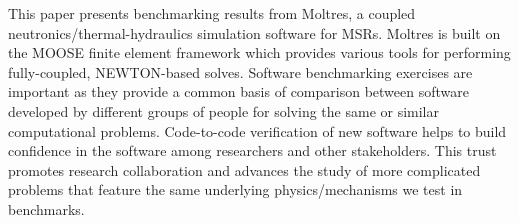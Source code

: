 This paper presents benchmarking results from Moltres, a coupled
neutronics/thermal-hydraulics simulation software for \glspl{MSR}. Moltres is
built on the \gls{MOOSE} \cite{gaston_physics-based_2015} finite element
framework which provides various tools for performing fully-coupled,
NEWTON-based solves. Software benchmarking exercises are important as they
provide a common basis of comparison between software developed by different
groups of people for solving the same or similar computational problems.
Code-to-code verification of new software helps to build confidence in the
software among researchers and other stakeholders. This trust promotes
research collaboration and advances the study of more complicated problems that
feature the same underlying physics/mechanisms we test in benchmarks.
